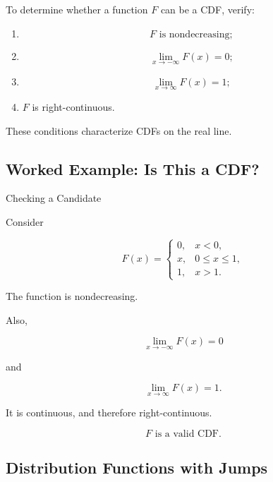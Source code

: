 To determine whether a function \(F\) can be a CDF, verify:

\begin{enumerate}
    \item
    \[
    F
    \text{ is nondecreasing};
    \]

    \item
    \[
    \lim_{x\to-\infty}F(x)=0;
    \]

    \item
    \[
    \lim_{x\to\infty}F(x)=1;
    \]

    \item \(F\) is right-continuous.
\end{enumerate}

These conditions characterize CDFs on the real line.

\subsection{Worked Example: Is This a CDF?}
\label{subsec:worked-valid-cdf}

\begin{workedexamplebox}{Checking a Candidate}

Consider

\[
F(x)
=
\begin{cases}
0,&x<0,\\
x,&0\leq x\leq1,\\
1,&x>1.
\end{cases}
\]

The function is nondecreasing.

Also,

\[
\lim_{x\to-\infty}F(x)=0
\]

and

\[
\lim_{x\to\infty}F(x)=1.
\]

It is continuous, and therefore right-continuous.

\begin{answerbox}
\[
\boxed{
F
\text{ is a valid CDF}.
}
\]
\end{answerbox}

\end{workedexamplebox}

\subsection{Distribution Functions with Jumps}
\label{subsec:cdf-with-jumps}

